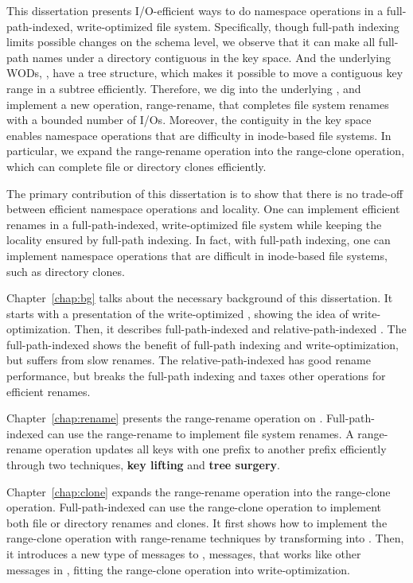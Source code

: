 This dissertation presents I/O-efficient ways to do namespace operations in a
full-path-indexed, write-optimized file system.
Specifically, though full-path indexing limits possible changes on the schema
level, we observe that it can make all full-path names under a directory
contiguous in the key space.
And the underlying WODs, \bets, have a tree structure, which makes it possible
to move a contiguous key range in a subtree efficiently.
Therefore, we dig into the underlying \bets, and implement a new operation,
range-rename, that completes file system renames with a bounded number of I/Os.
Moreover, the contiguity in the key space enables namespace operations that are
difficulty in inode-based file systems.
In particular, we expand the range-rename operation into the range-clone
operation, which can complete file or directory clones efficiently.

The primary contribution of this dissertation is to show that there is no
trade-off between efficient namespace operations and locality.
One can implement efficient renames in a full-path-indexed, write-optimized
file system while keeping the locality ensured by full-path indexing.
In fact, with full-path indexing, one can implement namespace operations that
are difficult in inode-based file systems, such as directory clones.

Chapter~\ref{chap:bg} talks about the necessary background of this dissertation.
It starts with a presentation of the write-optimized \bets,
showing the idea of write-optimization.
Then, it describes full-path-indexed \betrfs and relative-path-indexed \betrfs.
The full-path-indexed \betrfs shows the benefit of full-path indexing and
write-optimization, but suffers from slow renames.
The relative-path-indexed \betrfs has good rename performance, but breaks the
full-path indexing and taxes other operations for efficient renames.

Chapter~\ref{chap:rename} presents the range-rename operation on \bets.
Full-path-indexed \betrfs can use the range-rename to implement file system
renames.
A range-rename operation updates all keys with one prefix to another prefix
efficiently through two techniques,
\textbf{key lifting} and \textbf{tree surgery}.

Chapter~\ref{chap:clone} expands the range-rename operation into the
range-clone operation.
Full-path-indexed \betrfs can use the range-clone operation to implement both
file or directory renames and clones.
It first shows how to implement the range-clone operation with range-rename
techniques by transforming \bets into \bedags.
Then, it introduces a new type of messages to \bedags, \goto messages,
that works like other messages in \bedags,
fitting the range-clone operation into write-optimization.

